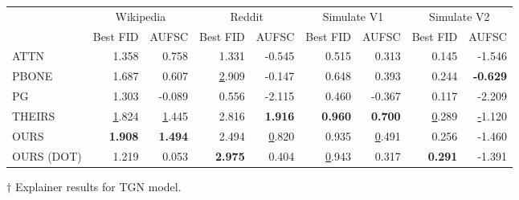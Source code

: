 \begin{tabular}{lrrrrrrrr}
\toprule
 & \multicolumn{2}{c}{Wikipedia} & \multicolumn{2}{c}{Reddit} & \multicolumn{2}{c}{Simulate V1} & \multicolumn{2}{c}{Simulate V2} \\
 & Best FID & AUFSC & Best FID & AUFSC & Best FID & AUFSC & Best FID & AUFSC \\
\midrule
ATTN & 1.358 & 0.758 & 1.331 & -0.545 & 0.515 & 0.313 & 0.145 & -1.546 \\
PBONE & 1.687 & 0.607 & \underline 2.909 & -0.147 & 0.648 & 0.393 & 0.244 & \bfseries -0.629 \\
PG & 1.303 & -0.089 & 0.556 & -2.115 & 0.460 & -0.367 & 0.117 & -2.209 \\
THEIRS & \underline 1.824 & \underline 1.445 & 2.816 & \bfseries 1.916 & \bfseries 0.960 & \bfseries 0.700 & \underline 0.289 & \underline -1.120 \\
OURS & \bfseries 1.908 & \bfseries 1.494 & 2.494 & \underline 0.820 & 0.935 & \underline 0.491 & 0.256 & -1.460 \\
OURS (DOT) & 1.219 & 0.053 & \bfseries 2.975 & 0.404 & \underline 0.943 & 0.317 & \bfseries 0.291 & -1.391 \\
\bottomrule
\end{tabular}
\caption{\label{tab:tgn_results}$\dagger$ Explainer results for TGN model.}
